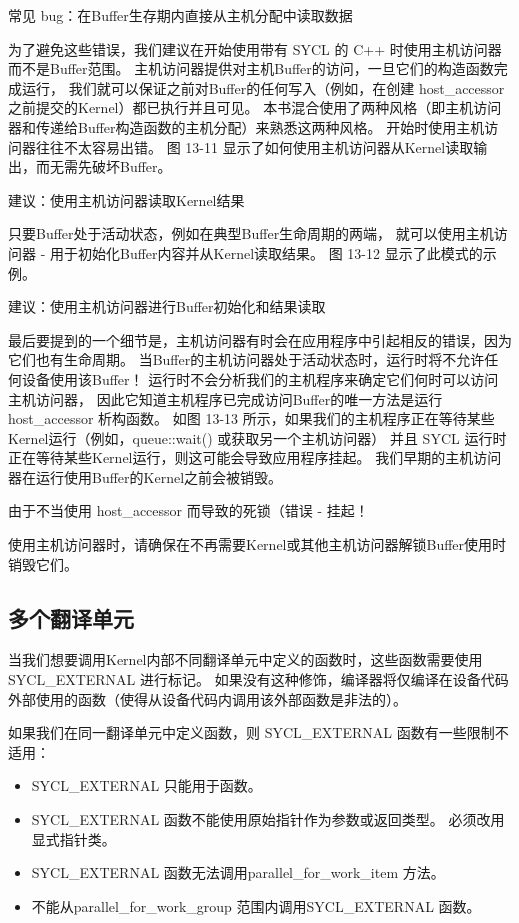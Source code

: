 {\color{red} 常见 bug：在Buffer生存期内直接从主机分配中读取数据}

为了避免这些错误，我们建议在开始使用带有 SYCL 的 C++ 时使用主机访问器而不是Buffer范围。 
主机访问器提供对主机Buffer的访问，一旦它们的构造函数完成运行，
我们就可以保证之前对Buffer的任何写入（例如，在创建 host\_accessor 之前提交的Kernel）都已执行并且可见。 
本书混合使用了两种风格（即主机访问器和传递给Buffer构造函数的主机分配）来熟悉这两种风格。 
开始时使用主机访问器往往不太容易出错。 图 13-11 显示了如何使用主机访问器从Kernel读取输出，而无需先破坏Buffer。

{\color{red} 建议：使用主机访问器读取Kernel结果}

只要Buffer处于活动状态，例如在典型Buffer生命周期的两端，
就可以使用主机访问器 - 用于初始化Buffer内容并从Kernel读取结果。 图 13-12 显示了此模式的示例。

{\color{red} 建议：使用主机访问器进行Buffer初始化和结果读取}

最后要提到的一个细节是，主机访问器有时会在应用程序中引起相反的错误，因为它们也有生命周期。 
当Buffer的主机访问器处于活动状态时，运行时将不允许任何设备使用该Buffer！ 
运行时不会分析我们的主机程序来确定它们何时可以访问主机访问器，
因此它知道主机程序已完成访问Buffer的唯一方法是运行 host\_accessor 析构函数。 
如图 13-13 所示，如果我们的主机程序正在等待某些Kernel运行（例如，queue::wait() 或获取另一个主机访问器）
并且 SYCL 运行时正在等待某些Kernel运行，则这可能会导致应用程序挂起。 
我们早期的主机访问器在运行使用Buffer的Kernel之前会被销毁。

{\color{red} 由于不当使用 host\_accessor 而导致的死锁（错误 - 挂起！}

\begin{remark}
	使用主机访问器时，请确保在不再需要Kernel或其他主机访问器解锁Buffer使用时销毁它们。
\end{remark}

\subsection{多个翻译单元}
当我们想要调用Kernel内部不同翻译单元中定义的函数时，这些函数需要使用 SYCL\_EXTERNAL 进行标记。 
如果没有这种修饰，编译器将仅编译在设备代码外部使用的函数（使得从设备代码内调用该外部函数是非法的）。

如果我们在同一翻译单元中定义函数，则 SYCL\_EXTERNAL 函数有一些限制不适用：

\begin{itemize}
	\item SYCL\_EXTERNAL 只能用于函数。

	\item SYCL\_EXTERNAL 函数不能使用原始指针作为参数或返回类型。 必须改用显式指针类。

	\item SYCL\_EXTERNAL 函数无法调用parallel\_for\_work\_item 方法。

	\item 不能从parallel\_for\_work\_group 范围内调用SYCL\_EXTERNAL 函数。
\end{itemize}

